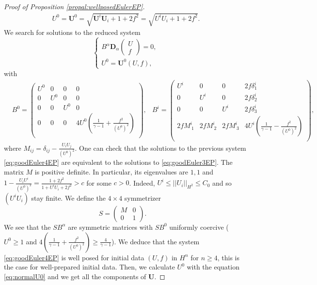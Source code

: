 \documentclass[a4paper, 15pt]{article}
\numberwithin{equation}{section}
\begin{document}
\begin{proof}[Proof of Proposition \ref{propal:wellposedEulerEP}]
  \begin{align}
  \label{eq:normalU0}
U^0=\textbf{U}^0=\sqrt{\textbf{U}^i\textbf{U}_i+1+2f^2}=\sqrt{U^iU_i+1+2f^2}.
  \end{align}
We search for solutions to the reduced system 
  \begin{equation}
  \label{eq:goodEuler4EP}
  \begin{cases}
       B^\alpha\textbf{D}_\alpha\begin{pmatrix}
    U \\
    f
\end{pmatrix}=0,\\
 U^0=\textbf{U}^0(U,f),
  \end{cases}
  \end{equation}
  with 
\begin{align*}
    &B^0=
\begin{pmatrix} 
	U^0 & 0 & 0 & 0\\
	0 & U^0  & 0 & 0 \\
	0 & 0 & U^0  & 0 \\
	0 & 0 & 0 & 4U^0(\frac{1}{\gamma-1}+\frac{f^2}{(U^0)^2})  \\
	\end{pmatrix}, &B^i=
\begin{pmatrix} 
	U^i & 0 & 0 & 2f\delta^i_1\\
	0 & U^i  & 0 & 2f\delta^i_2 \\
	0 & 0 & U^i  & 2f\delta^i_3 \\
	2fM^i_{~1} & 2fM^i_{~2} & 2fM^i_{~3} & 4U^i(\frac{1}{\gamma-1}-\frac{f^2}{(U^0)^2})  \\
	\end{pmatrix},
\end{align*}
where $M_{ij}=\delta_{ij}-\frac{U_iU_j}{(U^0)^2}$.
  One can check that the solutions to the previous system \eqref{eq:goodEuler4EP} are equivalent to the solutions to \eqref{eq:goodEuler3EP}. The matrix $M$ is positive definite. In particular, its eigenvalues are $1,1$ and $1-\frac{U_iU^i}{(U^0)^2}=\frac{1+2f^2}{1+U^iU_i+2f^2}>c$ for some $c>0$. Indeed, $U^i\leq ||U_i||_{H^2}\leq C_0$ and so $(U^iU_i)$ stay finite. We define the $4\times4$ symmetrizer 
  \[S=
\begin{pmatrix} 
	M & 0 \\
    0 & 1
	\end{pmatrix}.
	\quad
	\]
 We see that the $SB^\alpha$ are symmetric matrices with $SB^0$ uniformly coercive ($U^0\geq 1$ and $4(\frac{1}{\gamma-1}+\frac{f^2}{(U^0)^2})\geq \frac{4}{\gamma-1}$). We deduce that the system \eqref{eq:goodEuler4EP} is well posed for initial data $(U,f)$ in $H^n$ for $n\geq 4$, this is the case for well-prepared initial data. Then, we calculate $U^0$ with the equation \eqref{eq:normalU0} and we get all the components of $\textbf{U}$.
\end{proof}
\printbibliography
\end{document}
